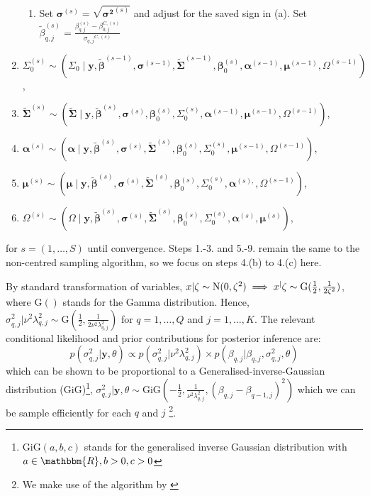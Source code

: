 \begin{enumerate}
\begin{enumerate}
        \item Set $\boldsymbol{\sigma}^{(s)} = \sqrt{{\boldsymbol{\sigma^2}}^{(s)}}$ and adjust for the saved sign in (a). Set $\tilde{\beta}_{q,j}^{(s)} = \frac{\beta_{q,j}^{(s)}-\beta_{0,j}^{C,(s)}}{{\sigma_{q,j}}^{C,(s)}}$
    \end{enumerate}
    \item $\Sigma^{(s)}_0 \sim (\Sigma_0\mid \boldsymbol{y},\boldsymbol{\tilde{\beta}}^{(s-1)},\boldsymbol{\sigma}^{(s-1)},\boldsymbol{\tilde{\Sigma}}^{(s-1)},\boldsymbol{\beta}_0^{(s)},\boldsymbol{\alpha}^{(s-1)},\boldsymbol{\mu}^{(s-1)}, \Omega^{(s-1)})$, 
    \item $\boldsymbol{\tilde{\Sigma}}^{(s)} \sim (\boldsymbol{\tilde{\Sigma}}\mid \boldsymbol{y},\boldsymbol{\tilde{\beta}}^{(s)},\boldsymbol{\sigma}^{(s)},\boldsymbol{{\beta}}_0^{(s)},\Sigma_0^{(s)},\boldsymbol{\alpha}^{(s-1)},\boldsymbol{\mu}^{(s-1)}, \Omega^{(s-1)})$, 
    \item $\boldsymbol{\alpha}^{(s)} \sim (\boldsymbol{\alpha} \mid \boldsymbol{y},\boldsymbol{\tilde{\beta}}^{(s)},\boldsymbol{\sigma}^{(s)},\boldsymbol{\tilde{\Sigma}}^{(s)},\boldsymbol{{\beta}}_0^{(s)},\Sigma_0^{(s)},\boldsymbol{\mu}^{(s-1)},\Omega^{(s-1)} )$, 
    \item $\boldsymbol{\mu}^{(s)} \sim (\boldsymbol{\mu} \mid \boldsymbol{y},\boldsymbol{\tilde{\beta}}^{(s)},\boldsymbol{\sigma}^{(s)},\boldsymbol{\tilde{\Sigma}}^{(s)},\boldsymbol{{\beta}}_0^{(s)},\Sigma_0^{(s)},\boldsymbol{\alpha}^{(s),},\Omega^{(s-1)})$, 
    \item $\Omega^{(s)} \sim (\Omega\mid \boldsymbol{y},\boldsymbol{\tilde{\beta}}^{(s)},\boldsymbol{\sigma}^{(s)},\boldsymbol{\tilde{\Sigma}}^{(s)},\boldsymbol{{\beta}}_0^{(s)},\Sigma_0^{(s)},\boldsymbol{\alpha}^{(s)},\boldsymbol{\mu}^{(s)} )$,
\end{enumerate}
%
for $s = (1,\dotsc,S)$ until convergence.
Steps 1.-3. and 5.-9. remain the same to the non-centred sampling algorithm, so we focus on steps 4.(b) to 4.(c) here. 
%

%
By standard transformation of variables, $x|\zeta \sim \mathrm{N}(0,\zeta^2) \implies x^|\zeta \sim \text{G}(\frac{1}{2},\frac{1}{2\zeta^2})$, where 
$\text{G}()$ stands for the Gamma distribution. Hence, $\sigma^2_{q,j}|\nu^2\lambda^2_{q,j} \sim \text{G}(\frac{1}{2},\frac{1}{2\nu^2\lambda_{q,j}^2})$ for $q = 1,\dotsc,Q$ and $j = 1,\dotsc,K$. The relevant conditional likelihood and prior contributions for posterior inference are:
%
\begin{equation}
    p(\sigma^2_{q,j}| \boldsymbol{y},\theta) \propto p(\sigma^2_{q,j}|\nu^2\lambda^2_{q,j})\times p(\beta_{q,j}|\beta_{q,j},\sigma^2_{q,j},\theta)
\end{equation}
%
which can be shown to be proportional to a Generalised-inverse-Gaussian distribution (GiG)\footnote{$\text{GiG}(a,b,c)$ stands for the generalised inverse Gaussian distribution with $a\in \mathbbm{R}, b>0,c>0$}, $\sigma^2_{q,j}| \boldsymbol{y},\theta \sim \text{GiG}(-\frac{1}{2},\frac{1}{\nu^2\lambda_{q,j}^2},(\beta_{q,j}-\beta_{q-1,j})^2)$ which we can be sample efficiently for each $q$ and $j$ \footnote{We make use of the algorithm by \citet{hormann2014generating}}.
%

